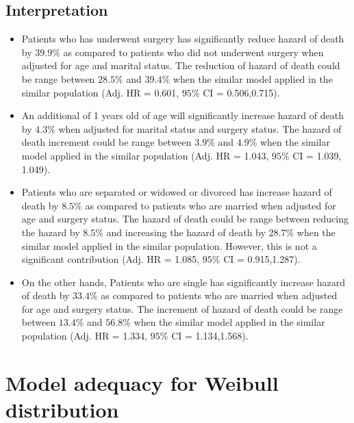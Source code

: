 \documentclass[
  10pt,
]{krantz}
\newenvironment{Shaded}{\begin{snugshade}}{\end{snugshade}}
\newcommand{\AttributeTok}[1]{\textcolor[rgb]{0.77,0.63,0.00}{#1}}
\newcommand{\DecValTok}[1]{\textcolor[rgb]{0.00,0.00,0.81}{#1}}
\newcommand{\FunctionTok}[1]{\textcolor[rgb]{0.00,0.00,0.00}{#1}}
\newcommand{\NormalTok}[1]{#1}
\newcommand{\SpecialCharTok}[1]{\textcolor[rgb]{0.00,0.00,0.00}{#1}}
\begin{document}
\hypertarget{interpretation-2}{%
\subsection{Interpretation}\label{interpretation-2}}

\begin{itemize}
\item
  Patients who has underwent surgery has significantly reduce hazard of death by \(39.9\%\) as compared to patients who did not underwent surgery when adjusted for age and marital status. The reduction of hazard of death could be range between \(28.5\%\) and \(39.4\%\) when the similar model applied in the similar population (Adj. HR = 0.601, \(95\%\) CI = 0.506,0.715).
\item
  An additional of 1 years old of age will significantly increase hazard of death by \(4.3\%\) when adjusted for marital status and surgery status. The hazard of death increment could be range between \(3.9\%\) and \(4.9\%\) when the similar model applied in the similar population (Adj. HR = 1.043, \(95\%\) CI = 1.039, 1.049).
\item
  Patients who are separated or widowed or divorced has increase hazard of death by \(8.5\%\) as compared to patients who are married when adjusted for age and surgery status. The hazard of death could be range between reducing the hazard by \(8.5\%\) and increasing the hazard of death by \(28.7\%\) when the similar model applied in the similar population. However, this is not a significant contribution (Adj. HR = 1.085, \(95\%\) CI = 0.915,1.287).
\item
  On the other hands, Patients who are single has significantly increase hazard of death by \(33.4\%\) as compared to patients who are married when adjusted for age and surgery status. The increment of hazard of death could be range between \(13.4\%\) and \(56.8\%\) when the similar model applied in the similar population (Adj. HR = 1.334, \(95\%\) CI = 1.134,1.568).
\end{itemize}

\hypertarget{model-adequacy-for-weibull-distribution}{%
\section{\texorpdfstring{Model adequacy for Weibull distribution}{Model adequacy for Weibull distribution}}\label{model-adequacy-for-weibull-distribution}}

\begin{Shaded}
\end{Shaded}
\end{document}
